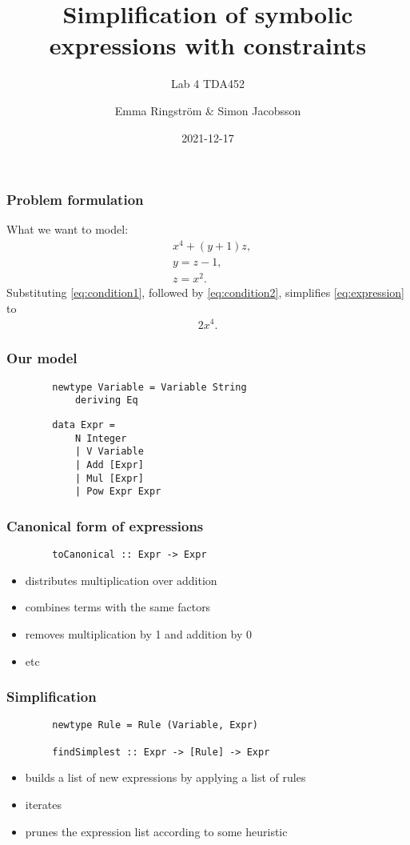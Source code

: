 \documentclass[english, 12pt, t, aspectratio=169]{beamer}
\title{Simplification of symbolic expressions with constraints}
\subtitle{Lab 4 TDA452}
\institute{Chalmers University of Technology}
\author{Emma Ringström \& Simon Jacobsson}
\date{2021-12-17}
\begin{document}
\begin{frame}
	\titlepage
\end{frame}

\begin{frame}[t]
	\frametitle{Problem formulation}
	What we want to model:
	\begin{align}
		&x^4 + (y + 1) z, \label{eq:expression}\\
		&y = z - 1, \label{eq:condition1}\\
		&z = x^2. \label{eq:condition2}
	\end{align}
	Substituting \eqref{eq:condition1}, followed by \eqref{eq:condition2}, simplifies \eqref{eq:expression} to
	\begin{align}
		2 x^4.
	\end{align}
	
\end{frame}
\begin{frame}[fragile]
	\frametitle{Our model}
	\begin{verbatim}
		newtype Variable = Variable String
		    deriving Eq
	\end{verbatim}
	\begin{verbatim}
		data Expr =
		    N Integer
		    | V Variable
		    | Add [Expr]
		    | Mul [Expr]
		    | Pow Expr Expr
	\end{verbatim}
	
\end{frame}
\begin{frame}[fragile]
	\frametitle{Canonical form of expressions}
	\begin{verbatim}
		toCanonical :: Expr -> Expr
	\end{verbatim}
	\begin{itemize}
		\item distributes multiplication over addition
		\item combines terms with the same factors
		\item removes multiplication by 1 and addition by 0
		\item etc
	\end{itemize}
\end{frame}
\begin{frame}[fragile]
	\frametitle{Simplification}
	\begin{verbatim}
		newtype Rule = Rule (Variable, Expr)

		findSimplest :: Expr -> [Rule] -> Expr
	\end{verbatim}

	\begin{itemize}
		\item builds a list of new expressions by applying a list of rules
		\item iterates
		\item prunes the expression list according to some heuristic
	\end{itemize}
\end{frame}
\end{document}
